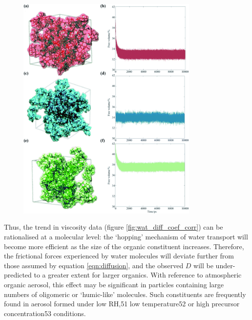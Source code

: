 \begin{figure}
    \centering
    \includegraphics[width=0.8\textwidth]{chapters/water_hopping/figures/f5.png}
    \label{fig:wat_packing_eff}
\end{figure}

Thus, the trend in viscosity data (figure \ref{fig:wat_diff_coef_corr}) can be rationalised at a molecular level: the `hopping’ mechanism of water transport will become more efficient as the size of the organic constituent increases. Therefore, the frictional forces experienced by water molecules will deviate further from those assumed by equation \ref{eqn:diffusion}, and the observed $D$ will be under-predicted to a greater extent for larger organics. With reference to atmospheric organic aerosol, this effect may be significant in particles containing large numbers of oligomeric or ‘humic-like’ molecules. Such constituents are frequently found in aerosol formed under low RH,51 low temperature52 or high precursor concentration53 conditions.

